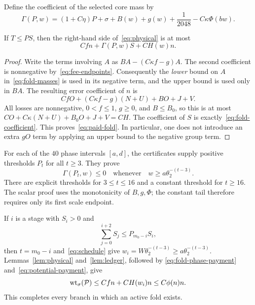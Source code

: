 Define the coefficient of the selected core mass by
\begin{equation}\label{eq:fold-coefficient}
 \Gamma(P,w)=(1+C\eta)P+\sigma+B(w)+g(w)+\frac1{2048}
                                     -C\kappa\Phi(bw).
\end{equation}
\begin{lemma}\label{lem:ledger}
If $T\le PS$, then the right-hand side of~\eqref{eq:physical} is at most
\begin{equation}\label{eq:paid-fold}
                Cf n+\Gamma(P,w)S+CH(w)n.
\end{equation}
\end{lemma}
\begin{proof}
Write the terms involving $A$ as $BA-(C\kappa f-g)A$.
The second coefficient is nonnegative by~\eqref{eq:fee-endpoints}.
Consequently the \emph{lower} bound on $A$ in~\eqref{eq:fold-masses}
is used in its negative term, and the upper bound is used only in $BA$.
The resulting error coefficient of $n$ is
\[
 CfO+(C\kappa f-g)(N+U)+BO+J+V.
\]
All losses are nonnegative, $0<f\le1$, $g\ge0$, and $B\le B_0$, so this
is at most $CO+C\kappa(N+U)+B_0O+J+V=CH$.
The coefficient of $S$ is exactly~\eqref{eq:fold-coefficient}.
This proves~\eqref{eq:paid-fold}. In particular, one does not introduce
an extra $gO$ term by applying an upper bound to the negative group term.
\end{proof}

For each of the $40$ phase intervals $[a,d]$, the certificates supply
positive thresholds $P_t$ for all $t\ge3$. They prove
\begin{equation}\label{eq:fold-phase-payment}
 \Gamma(P_t,w)\le0\quad\text{whenever}\quad
                   w\ge a\theta_2^{-(t-3)}.
\end{equation}
There are explicit thresholds for $3\le t\le16$ and a constant threshold
for $t\ge16$. The scalar proof uses the monotonicity of $B,g,\Phi$;
the constant tail therefore requires only its first scale endpoint.

If $i$ is a stage with $S_i>0$ and
\begin{equation}\label{eq:fold-test}
                   \sum_{j=0}^{i+2}S_j\le P_{m_0-i}S_i,
\end{equation}
then $t=m_0-i$ and~\eqref{eq:schedule} give
$w_i=W\theta_2^{-(t-3)}\ge a\theta_2^{-(t-3)}$.
Lemmas~\ref{lem:physical} and~\ref{lem:ledger}, followed by
\eqref{eq:fold-phase-payment} and~\eqref{eq:potential-payment}, give
\[
        \operatorname{wt}_\sigma(\mathcal P)\le Cf n+CH(w_i)n\le C\phi(n)n.
\]
This completes every branch in which an active fold exists.
